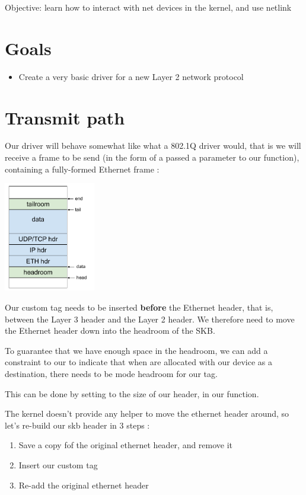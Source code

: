 {Objective: learn how to interact with net devices in the kernel, and use netlink}

\section{Goals}
 
 \begin{itemize}
 \item Create a very basic driver for a new Layer 2 network protocol
 \end{itemize}
 
\section{Transmit path}

Our driver will behave somewhat like what a 802.1Q driver would, that is we will
receive a frame to be send (in the form of a  passed a parameter to
our  function), containing a fully-formed Ethernet frame :

\begin{center}
\includegraphics[width=0.3\textwidth]{labs/networking-skb/01_blan_skb.pdf}
\end{center}

Our custom tag needs to be inserted \textbf{before} the Ethernet header, that is, between the Layer 3 header and the Layer 2 header. We therefore need to move the Ethernet header down into the headroom of the SKB.

To guarantee that we have enough space in the headroom, we can add a constraint to our  to indicate
that when  are allocated with our device as a destination, there needs to be mode headroom for our tag.

This can be done by setting  to the size of our header, in our  function.

The kernel doesn't provide any helper to move the ethernet header around, so let's re-build our skb header in 3 steps :
\begin{enumerate}
	\item Save a copy fof the original ethernet header, and remove it
	\item Insert our custom tag
	\item Re-add the original ethernet header
\end{enumerate}

